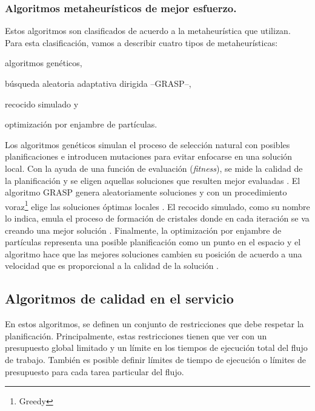 \subsubsection{Algoritmos metaheurísticos de mejor esfuerzo.}

Estos algoritmos son clasificados de acuerdo a la metaheurística que utilizan. Para esta clasificación, vamos a describir cuatro tipos de metaheurísticas: 
\begin{enumerate*}[label=\alph*)]
\item{algoritmos genéticos,}
\item{búsqueda aleatoria adaptativa dirigida --GRASP--,}
\item{recocido simulado y}
\item{optimización por enjambre de partículas.}
\end{enumerate*}

Los algoritmos genéticos simulan el proceso de selección natural con posibles planificaciones e introducen mutaciones para evitar enfocarse en una solución local. Con la ayuda de una función de evaluación (\emph{fitness}), se mide la calidad de la planificación y se eligen aquellas soluciones que resulten mejor evaluadas \cite{yu2006scheduling}. El algoritmo GRASP \cite{blythe2005task} genera aleatoriamente soluciones y con un procedimiento voraz\footnote{Greedy} elige las soluciones óptimas locales \cite{blythe2005task}. El recocido simulado, como su nombre lo indica, emula el proceso de formación de cristales donde en cada iteración se va creando una mejor solución \cite{young2003scheduling}. Finalmente, la optimización por enjambre de partículas representa una posible planificación como un punto en el espacio y el algoritmo hace que las mejores soluciones cambien su posición de acuerdo a una velocidad que es proporcional a la calidad de la solución \cite{wu2010revised}.


\subsection{Algoritmos de calidad en el servicio}

En estos algoritmos, se definen un conjunto de restricciones que debe respetar la planificación. Principalmente, estas restricciones tienen que ver con un presupuesto global limitado y un límite en los tiempos de ejecución total del flujo de trabajo. También es posible definir límites de tiempo de ejecución o límites de presupuesto para cada tarea particular del flujo.

